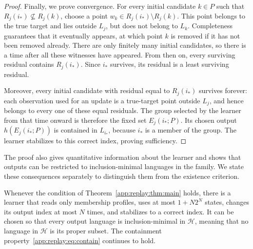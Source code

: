 \begin{proof}
Finally, we prove convergence. For every initial candidate $k\in P$
such that $R_j(i_*)\nsubseteq R_j(k)$, choose a point
$w_k\in R_j(i_*)\setminus R_j(k)$. This point belongs to the true
target and lies outside $L_j$, but does not belong to $L_k$.
Completeness guarantees that it eventually appears, at which point
$k$ is removed if it has not been removed already. There are only
finitely many initial candidates, so there is a time after all these
witnesses have appeared. From then on, every surviving residual
contains $R_j(i_*)$. Since $i_*$ survives, its residual is a least
surviving residual.

Moreover, every initial candidate with residual equal to
$R_j(i_*)$ survives forever: each observation used for an update is
a true-target point outside $L_j$, and hence belongs to every one
of these equal residuals. The group selected by the learner from
that time onward is therefore the fixed set $E_j(i_*;P)$. Its
chosen output $h(E_j(i_*;P))$ is contained in $L_{i_*}$, because
$i_*$ is a member of the group. The learner stabilizes to this
correct index, proving sufficiency.
\end{proof}

The proof also gives quantitative information about the learner and
shows that outputs can be restricted to inclusion-minimal languages
in the family. We state these consequences separately to distinguish
them from the existence criterion.

\begin{suppcor}
\label{app:replay:cor:implementation}
Whenever the condition of Theorem~\ref{app:replay:thm:main} holds,
there is a learner that reads only membership profiles, uses at
most $1+N2^N$ states, changes its output index at most $N$ times,
and stabilizes to a correct index. It can be chosen so that every
output language is inclusion-minimal in $\mathcal H$, meaning that
no language in $\mathcal H$ is its proper subset. The containment
property~\eqref{app:replay:eq:contain} continues to hold.
\end{suppcor}

